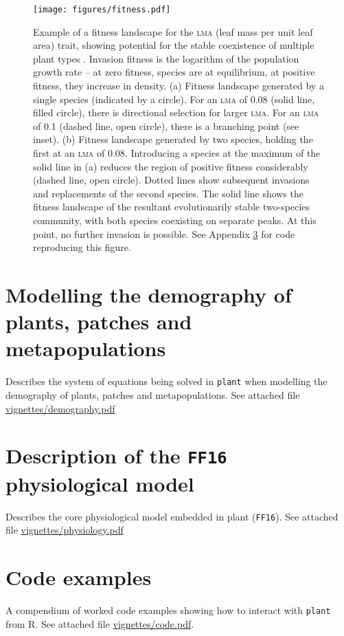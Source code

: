 \documentclass[a4paper,11pt]{article}
\newcommand{\plant}{\texttt{plant}}
\begin{document}
\begin{figure}[h!]
\centering
\texttt{[image: figures/fitness.pdf]}
\caption{Example of a fitness landscape for the \textsc{lma} (leaf mass per
 unit leaf area) trait, showing potential for the stable coexistence of
 multiple plant types \citep[adapted from][]{Falster-2015}. Invasion fitness is the logarithm of the population growth rate --
 at zero fitness, species are at equilibrium, at positive fitness, they increase in
 density. (a) Fitness landscape generated by a single species (indicated by
 a circle). For an \textsc{lma} of 0.08 (solid line, filled circle), there is
 directional selection for larger \textsc{lma}. For an \textsc{lma} of
 0.1 (dashed line, open circle), there is a branching point (see inset). (b) Fitness landscape generated by two species, holding
 the first at an \textsc{lma} of 0.08. Introducing a species at the
 maximum of the solid line in (a) reduces the region of positive
 fitness considerably (dashed line, open circle). Dotted lines show
 subsequent invasions and replacements of the second species. The
 solid line shows the fitness landscape of the resultant evolutionarily stable two-species community, with both species coexisting
 on separate peaks. At this point, no further
 invasion is possible. See Appendix \ref{sec:code} for code
 reproducing this figure.}
\label{fig:fitness}
\end{figure}

\clearpage
\setcounter{secnumdepth}{1}

\begin{appendices}\label{sec:appendices}

\section{Modelling the demography of plants, patches and metapopulations}\label{sec:demography}

Describes the system of equations being solved in {\plant} when modelling the demography of plants, patches and metapopulations. See attached file \url{vignettes/demography.pdf}

\section{Description of the \texttt{FF16} physiological model}\label{sec:FF16}

Describes the core physiological model embedded in plant (\texttt{FF16}). See attached file \url{vignettes/physiology.pdf}

\section{Code examples}\label{sec:code}

A compendium of worked code examples showing how to interact with {\plant} from R.
See attached file \url{vignettes/code.pdf}.

\end{appendices}
\end{document}

